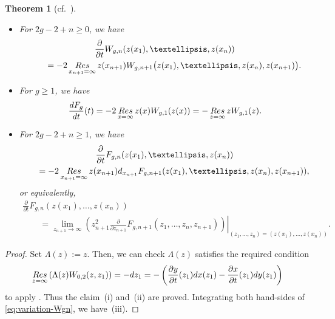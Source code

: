 \documentclass[11pt]{article}
\newtheorem{thm}{Theorem}[section]
\theoremstyle{definition}
\numberwithin{equation}{section}
\def\p{\partial}
\newcommand{\Res}{\mathop{\rm Res}}
\begin{document}
\begin{thm} [cf.~]\label{thm:variation}\quad
\begin{itemize}\itemsep=0pt
\item[$(i)$]
For $2g-2+n \ge 0$, we have
\begin{gather}
\frac{\p}{\p t} W_{g,n}(z(x_{1}), \dots, z(x_{n}))\nonumber\\
\qquad{}
= -2\Res_{x_{n+1}=\infty} z(x_{n+1})
W_{g,n+1}\bigl( z(x_{1}),\dots,z(x_{n}),z(x_{n+1}) \bigr).\label{eq:variation-Wgn}
\end{gather}
\item[$(ii)$]
For $g \ge 1$, we have
\begin{gather} \label{eq:dt-closed-Fg}
\frac{dF_{g}}{dt}(t)
 = - 2\Res_{x=\infty} z(x) W_{g,1}(z(x))
= -\Res_{z=\infty} z W_{g,1}(z).
\end{gather}
\item[$(iii)$]
For $2g-2+ n \ge 1$, we have
\begin{gather*} %
\frac{\p}{\p t} F_{g,n}(z(x_{1}),\dots,z(x_{n})) \\
\qquad{} =
- 2\Res_{x_{n+1}=\infty} z(x_{n+1})
d_{x_{n+1}} F_{g,n+1}(z(x_{1}),\dots,z(x_{n}),z(x_{n+1})),
\end{gather*}
or equivalently,
\begin{gather}
\frac{\p}{\p t} F_{g,n}(z(x_{1}),\dots,z(x_{n})) \nonumber\\
\qquad{}= \lim_{z_{n+1} \rightarrow \infty} \left.
\left( z_{n+1}^{2}
\frac{\p}{\p z_{n+1}}F_{g,n+1}(z_{1},\dots,z_{n},z_{n+1})\right)
\right|_{(z_{1},\dots,z_{n})=(z(x_{1}), \dots, z(x_{n}))}. \label{eq:variation-openFgn-2}
\end{gather}
\end{itemize}
\end{thm}

\begin{proof}
Set $\Lambda(z) := z$.
Then, we can check $\Lambda(z)$ satisf\/ies
the required condition
\begin{gather*} %
\Res_{z=\infty} \left( \Lambda(z) W_{0,2}(z,z_{1}) \right) = - dz_{1}
= - \left(\frac{\p y}{\p t}(z_{1}) dx(z_{1}) -
\frac{\p x}{\p t}(z_{1}) dy(z_{1}) \right)
\end{gather*} %
to apply \cite[Theorem~5.1]{EO07}. Thus the claim~(i) and~(ii)
are proved. Integrating both hand-sides of
\eqref{eq:variation-Wgn}, we have~(iii).
\end{proof}
\end{document}
